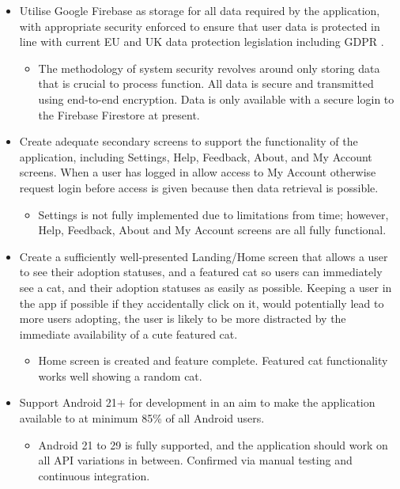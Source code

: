 \begin{itemize}
    \item Utilise Google Firebase as storage for all data required by the application, with appropriate security enforced to ensure that user data is protected in line with current EU and UK data protection legislation including GDPR \cite{GDPRARTICLE1}.
    \begin{itemize}
        \item The methodology of system security revolves around only storing data that is crucial to process function. All data is secure and transmitted using end-to-end encryption. Data is only available with a secure login to the Firebase Firestore at present.
    \end{itemize}
    
    \item Create adequate secondary screens to support the functionality of the application, including Settings, Help, Feedback, About, and My Account screens. When a user has logged in allow access to My Account otherwise request login before access is given because then data retrieval is possible.
    \begin{itemize}
        \item Settings is not fully implemented due to limitations from time; however, Help, Feedback, About and My Account screens are all fully functional.
    \end{itemize}
    
    \item Create a sufficiently well-presented Landing/Home screen that allows a user to see their adoption statuses, and a featured cat so users can immediately see a cat, and their adoption statuses as easily as possible. Keeping a user in the app if possible if they accidentally click on it, would potentially lead to more users adopting, the user is likely to be more distracted by the immediate availability of a cute featured cat.
    \begin{itemize}
        \item Home screen is created and feature complete. Featured cat functionality works well showing a random cat.
    \end{itemize}
    
    \item Support Android 21+ for development in an aim to make the application available to at minimum 85\% of all Android users.
    \begin{itemize}
        \item Android 21 to 29 is fully supported, and the application should work on all API variations in between. Confirmed via manual testing and continuous integration.
    \end{itemize}
    

\end{itemize}
